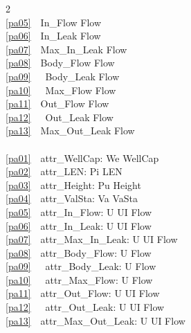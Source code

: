 \mnewfoil
\begin{multicols}{2}\LLLL
\bp
{} \\
\ref{pa05}\ \ In\_Flow {\EQ} Flow\\
\ref{pa06}\ \ In\_Leak {\EQ} Flow\\
\ref{pa07}\ \ Max\_In\_Leak {\EQ} Flow\\
\ref{pa08}\ \ Body\_Flow {\EQ} Flow\\
\ref{pa09}\ \ \ Body\_Leak {\EQ} Flow\\
\ref{pa10}\ \ \ Max\_Flow {\EQ} Flow\\
\ref{pa11}\ \ Out\_Flow {\EQ} Flow\\
\ref{pa12}\ \ \ Out\_Leak {\EQ} Flow \\
\ref{pa13}\ \ Max\_Out\_Leak {\EQ} Flow\\
\\
\ref{pa01}\ \ attr\_WellCap: We {\RIGHTARROW} WellCap\ \ \ \ \\
\ref{pa02}\ \ attr\_LEN: Pi {\RIGHTARROW} LEN\ \ \ \\
\ref{pa03}\ \ attr\_Height: Pu {\RIGHTARROW} Height\\
\ref{pa04}\ \ attr\_ValSta: Va {\RIGHTARROW} VaSta\\
\ref{pa05}\ \ attr\_In\_Flow: U {\RIGHTARROW} UI {\RIGHTARROW} Flow\\
\ref{pa06}\ \ attr\_In\_Leak: U {\RIGHTARROW} UI {\RIGHTARROW} Flow \ \ \\
\ref{pa07}\ \ attr\_Max\_In\_Leak: U {\RIGHTARROW} UI {\RIGHTARROW} Flow \ \ \\
\ref{pa08}\ \ attr\_Body\_Flow: U {\RIGHTARROW} Flow \ \ \ \ \\
\ref{pa09}\ \ \ attr\_Body\_Leak: U {\RIGHTARROW} Flow\ \ \\
\ref{pa10}\ \ \ attr\_Max\_Flow: U {\RIGHTARROW} Flow\ \ \\
\ref{pa11}\ \ attr\_Out\_Flow: U {\RIGHTARROW} UI {\RIGHTARROW} Flow\ \ \\
\ref{pa12}\ \ \ attr\_Out\_Leak: U {\RIGHTARROW} UI {\RIGHTARROW} Flow  \\
\ref{pa13}\ \ attr\_Max\_Out\_Leak: U {\RIGHTARROW} UI {\RIGHTARROW} Flow
\ep
\end{multicols}

